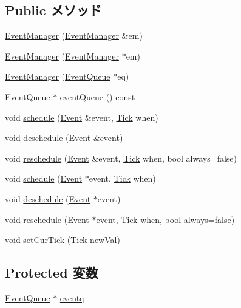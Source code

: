 \subsection*{Public メソッド}
\begin{DoxyCompactItemize}
\item 
\hyperlink{classEventManager_a311f2d5c8b94bea825c05571dc4ca2e2}{EventManager} (\hyperlink{classEventManager}{EventManager} \&em)
\item 
\hyperlink{classEventManager_a4aafa6652fafd95a60dd7e1a75393cd8}{EventManager} (\hyperlink{classEventManager}{EventManager} $\ast$em)
\item 
\hyperlink{classEventManager_ada835c7c11d268771405122be1ef29f0}{EventManager} (\hyperlink{classEventQueue}{EventQueue} $\ast$eq)
\item 
\hyperlink{classEventQueue}{EventQueue} $\ast$ \hyperlink{classEventManager_ad6e91e91036b003cf3661959078e677f}{eventQueue} () const 
\item 
void \hyperlink{classEventManager_a4ddebbfe9a12b95be6fb993ce892dcd3}{schedule} (\hyperlink{classEvent}{Event} \&event, \hyperlink{base_2types_8hh_a5c8ed81b7d238c9083e1037ba6d61643}{Tick} when)
\item 
void \hyperlink{classEventManager_a720e34da4db679fb3f30b20e55c23605}{deschedule} (\hyperlink{classEvent}{Event} \&event)
\item 
void \hyperlink{classEventManager_a83fe8e2d06cd7c6e36743e5beb07298f}{reschedule} (\hyperlink{classEvent}{Event} \&event, \hyperlink{base_2types_8hh_a5c8ed81b7d238c9083e1037ba6d61643}{Tick} when, bool always=false)
\item 
void \hyperlink{classEventManager_a3abda7ed04856f4f98b31ceacdc78562}{schedule} (\hyperlink{classEvent}{Event} $\ast$event, \hyperlink{base_2types_8hh_a5c8ed81b7d238c9083e1037ba6d61643}{Tick} when)
\item 
void \hyperlink{classEventManager_ab1b8fc2b2605fdc1d88bf07a86e1fe07}{deschedule} (\hyperlink{classEvent}{Event} $\ast$event)
\item 
void \hyperlink{classEventManager_a676294f5f01031f3dfdf956185390db8}{reschedule} (\hyperlink{classEvent}{Event} $\ast$event, \hyperlink{base_2types_8hh_a5c8ed81b7d238c9083e1037ba6d61643}{Tick} when, bool always=false)
\item 
void \hyperlink{classEventManager_abc2f41fbb4828612a2637268ab8ce640}{setCurTick} (\hyperlink{base_2types_8hh_a5c8ed81b7d238c9083e1037ba6d61643}{Tick} newVal)
\end{DoxyCompactItemize}
\subsection*{Protected 変数}
\begin{DoxyCompactItemize}
\item 
\hyperlink{classEventQueue}{EventQueue} $\ast$ \hyperlink{classEventManager_acfd644007a0f188b7f221e67a6b453aa}{eventq}
\end{DoxyCompactItemize}


